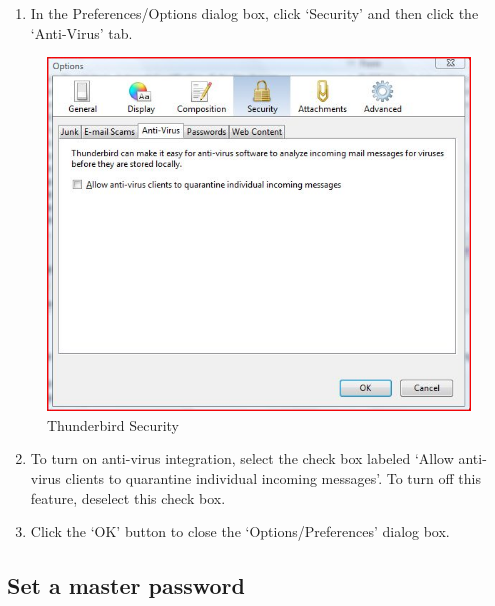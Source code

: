 \begin{enumerate}[1.]
\item
  In the Preferences/Options dialog box, click `Security' and then click
  the `Anti-Virus' tab.
\end{enumerate}
\begin{figure}[htbp]
\centering
\includegraphics{thunderbird_sec_3.jpg}
\caption{Thunderbird Security}
\end{figure}

\begin{enumerate}[1.]
\setcounter{enumi}{1}
\item
  To turn on anti-virus integration, select the check box labeled `Allow
  anti-virus clients to quarantine individual incoming messages'. To
  turn off this feature, deselect this check box.
\item
  Click the `OK' button to close the `Options/Preferences' dialog box.
\end{enumerate}
\subsection{Set a master password}

